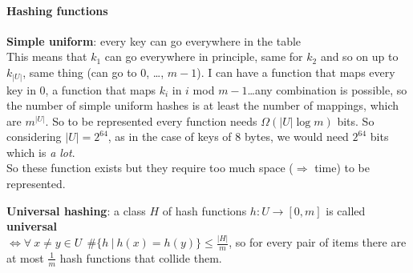 \documentclass[10pt]{report}
\begin{document}
\paragraph{Hashing functions}
\begin{list}{}{}
	\item \textbf{Simple uniform}: every key can go everywhere in the table\\
	This means that $k_1$ can go everywhere in principle, same for $k_2$ and so on up to $k_{|U|}$, same thing (can go to $0$, \ldots, $m-1$). I can have a function that maps every key in $0$, a function that maps $k_i$ in $i$ mod $m-1$\ldots any combination is possible, so the number of simple uniform hashes is at least the number of mappings, which are $m^{|U|}$. So to be represented every function needs $\Omega(|U|\log m)$ bits. So considering $|U|=2^{64}$, as in the case of keys of 8 bytes, we would need $2^{64}$ bits which is \textit{a lot}.\\
	So these function exists but they require too much space ($\Rightarrow$ time) to be represented.
	\item \textbf{Universal hashing}: a class $H$ of hash functions $h:U\rightarrow [0,m]$ is called \textbf{universal}\\ $\Leftrightarrow\forall\:x\neq y\in U\:\:\#\{h\:|\:h(x)=h(y)\}\leq \frac{|H|}{m}$, so for every pair of items there are at most $\frac{1}{m}$ hash functions that collide them.
\end{list}
\end{document}
